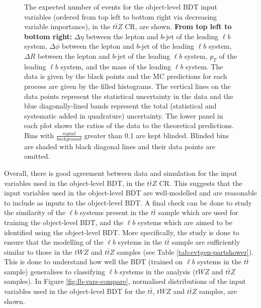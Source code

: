 \begin{figure}[htbp]
\caption{The expected number of events for the object-level BDT input variables (ordered from top left to bottom right via decreasing variable importance), in the $t\bar{t}Z$ CR, are shown. \textbf{From top left to bottom right:} $\Delta \eta$ between the lepton and $b$-jet of the leading $\ell b$ system, $\Delta \phi$ between the lepton and $b$-jet of the leading $\ell b$ system, $\Delta R$ between the lepton and $b$-jet of the leading $\ell b$ system, $p_{T}$ of the leading $\ell b$ system, and the mass of the leading $\ell b$ system. The data is given by the black points and the MC predictions for each process are given by the filled histograms. The vertical lines on the data points represent the statistical uncertainty in the data and the blue diagonally-lined bands represent the total (statistical and systematic added in quadrature) uncertainty. The lower panel in each plot shows the ratios of the data to the theoretical predictions. Bins with $\frac{signal}{background}$ greater than 0.1 are kept blinded. Blinded bins are shaded with black diagonal lines and their data points are omitted. }
  \label{fig:4lep-ttZCR-objectbdt-vars}
\end{figure}Overall, there is good agreement between data and simulation for the input variables used in the object-level BDT, in the $t\bar{t}Z$ CR. This suggests that the input variables used in the object-level BDT are well-modelled and are reasonable to include as inputs to the object-level BDT. A final check can be done to study the similarity of the $\ell b$ systems present in the $t\bar{t}$ sample which are used for training the object-level BDT, and the $\ell b$ systems which are aimed to be identified using the object-level BDT. More specifically, the study is done to ensure that the modelling of the $\ell b$ systems in the $t\bar{t}$ sample are sufficiently similar to those in the $tWZ$ and $t\bar{t}Z$ samples (see Table \ref{tab:evtgen-partshower}). This is done to understand how well the BDT (trained on $\ell b$ systems in the $t\bar{t}$ sample) generalises to classifying $\ell b$ systems in the analysis ($tWZ$ and $t\bar{t}Z$ samples). In Figure \ref{fig:lb-vars-compare}, normalised distributions of the input variables used in the object-level BDT for the $t\bar{t}$, $tWZ$ and $t\bar{t}Z$ samples, are shown.

